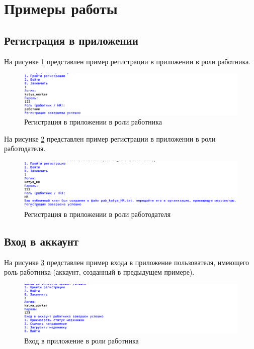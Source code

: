 \documentclass[12pt]{report}
\begin{document}
\section{Примеры работы}
\subsection{Регистрация в приложении}
На рисунке \ref{fig:reg-worker} представлен пример регистрации в приложении в роли работника.
\begin{figure}[h!]
	\centering
	\includegraphics[scale=0.8]{reg-worker.png}
	\caption{Регистрация в приложении в роли работника}
	\label{fig:reg-worker}
\end{figure}

На рисунке \ref{fig:reg-hr} представлен пример регистрации в приложении в роли работодателя.
\begin{figure}[h!]
	\centering
	\includegraphics[width = \linewidth]{reg-hr.png}
	\caption{Регистрация в приложении в роли работодателя}
	\label{fig:reg-hr}
\end{figure}

\subsection{Вход в аккаунт}

На рисунке \ref{fig:log-worker} представлен пример входа в приложение пользователя, имеющего роль работника (аккаунт, созданный в предыдущем примере).
\begin{figure}[h!]
	\centering
	\includegraphics[scale=0.8]{log-worker.png}
	\caption{Вход в приложение в роли работника}
	\label{fig:log-worker}
\end{figure}
\end{document}
